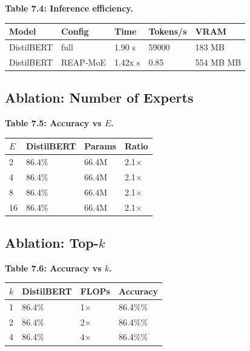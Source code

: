 \textbf{Table 7.4: Inference efficiency.}

\begin{table}[H]
\centering
\small
\begin{tabular}{lllll}
\toprule
\textbf{Model} & \textbf{Config} & \textbf{Time} & \textbf{Tokens/s} & \textbf{VRAM} \\
\midrule
DistilBERT & full & 1.90 s & 59000 & 183 MB \\
DistilBERT & REAP-MoE & 1.42x s & 0.85 & 554 MB MB \\
\bottomrule
\end{tabular}
\end{table}

\subsection{Ablation: Number of Experts}

\textbf{Table 7.5: Accuracy vs $E$.}

\begin{table}[H]
\centering
\small
\begin{tabular}{llll}
\toprule
\textbf{$E$} & \textbf{DistilBERT} & \textbf{Params} & \textbf{Ratio} \\
\midrule
2 & 86.4\% & 66.4M & 2.1$\times$ \\
4 & 86.4\% & 66.4M & 2.1$\times$ \\
8 & 86.4\% & 66.4M & 2.1$\times$ \\
16 & 86.4\% & 66.4M & 2.1$\times$ \\
\bottomrule
\end{tabular}
\end{table}

\subsection{Ablation: Top-$k$}

\textbf{Table 7.6: Accuracy vs $k$.}

\begin{table}[H]
\centering
\small
\begin{tabular}{llll}
\toprule
\textbf{$k$} & \textbf{DistilBERT} & \textbf{FLOPs} & \textbf{Accuracy} \\
\midrule
1 & 86.4\% & 1$\times$ & 86.4\%\% \\
2 & 86.4\% & 2$\times$ & 86.4\%\% \\
4 & 86.4\% & 4$\times$ & 86.4\%\% \\
\bottomrule
\end{tabular}
\end{table}

